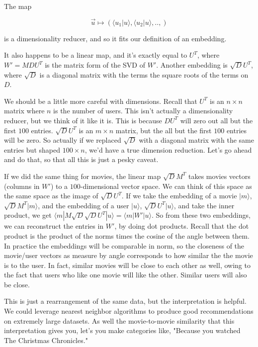 \documentclass{amsbook}
\begin{document}
The map

$$
\vec u\mapsto\left(\langle u_1|u\rangle, \langle u_2|u\rangle, ..,\right)
$$

\noindent is a dimensionality reducer, and so it fits our definition of an embedding.

It also happens to be a linear map, and it's exactly equal to $U^T$, where $W'=MDU^T$ is the matrix form of the SVD of $W'$.  Another embedding is $\sqrt{D}U^T$, where $\sqrt{D}$ is a diagonal matrix with the terms the square roots of the terms on $D$.

We should be a little more careful with dimensions.  Recall that $U^T$ is an $n\times n$ matrix where $n$ is the number of users.  This isn't actually a dimensionality reducer, but we think of it like it is.  This is because $DU^T$ will zero out all but the first $100$ entries.  $\sqrt DU^T$ is an $m\times n$ matrix, but the all but the first $100$ entries will be zero.  So actually if we replaced $\sqrt D$ with a diagonal matrix with the same entries but shaped $100\times n$, we'd have a true dimension reduction.  Let's go ahead and do that, so that all this is just a pesky caveat.

If we did the same thing for movies, the linear map $\sqrt DM^T$ takes movies vectors (columns in $W'$) to a $100$-dimensional vector space.  We can think of this space as the same space as the image of $\sqrt DU^T$.  If we take the embedding of a movie $|m\rangle$, $\sqrt DM^T|m\rangle$, and the embedding of a user $|u\rangle$, $\sqrt DU^T|u\rangle$, and take the inner product, we get $\langle m|M\sqrt D\sqrt DU^T|u\rangle=\langle m|W'|u\rangle$.  So from these two embeddings, we can reconstruct the entries in $W'$, by doing dot products.  Recall that the dot product is the product of the norms times the cosine of the angle between them.  In practice the embeddings will be comparable in norm, so the closeness of the movie/user vectors as measure by angle corresponds to how similar the the movie is to the user.  In fact, similar movies will be close to each other as well, owing to the fact that users who like one movie will like the other.  Similar users will also be close.

This is just a rearrangement of the same data, but the interpretation is helpful.  We could leverage nearest neighbor algorithms to produce good recommendations on extremely large datasets.  As well the movie-to-movie similarity that this interpretation gives you, let's you make categories like, "Because you watched The Christmas Chronicles."
\end{document}
